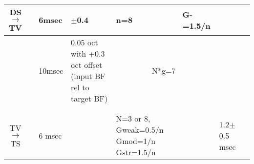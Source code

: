 \begin{longtable}{cXXXXXXX}
  DS\ensuremath{\rightarrow}TV   &                                                       \citep{ErikssonRobert:1999}                                                        &                                                      6msec                                                      &                         $\pm$0.4                          &                    n=8                    &                                           G-=1.5/n                                          &                                           & \\\hline 
                                 &                                                         \citep{ReissYoung:2005}                                                          &                                                     10msec                                                      & 0.05 oct with +0.3 oct offset (input BF rel to target BF) &                                                        \multicolumn{2}{c}{N*g=7}                                                        &                                           & \\\hline 
                                 & \citep{YoungDavis:2002,HancockDavisEtAl:2001,SpirouDavisEtAl:1999,HancockDavisEtAl:1997,DavisVoigt:1996,DavisVoigt:1994,DavisVoigt:1991} &                                                                                                                 &                                                           &                                           &                                                                                             &                                           & \\\hline 
                                 &                                                         \citep{ReissYoung:2005}                                                          &                                                                                                                 &                                                           &                                           &                                                                                             &                                           & \\\hline 
  TV\ensuremath{\rightarrow}TS   &                                                       \citep{ErikssonRobert:1999}                                                        &                                                     6 msec                                                      &                                                           & N=3 or 8, Gweak=0.5/n Gmod=1/n Gstr=1.5/n &                                                                                             & 1.2$\pm$0.5 msec \\\hline 


\end{longtable}
